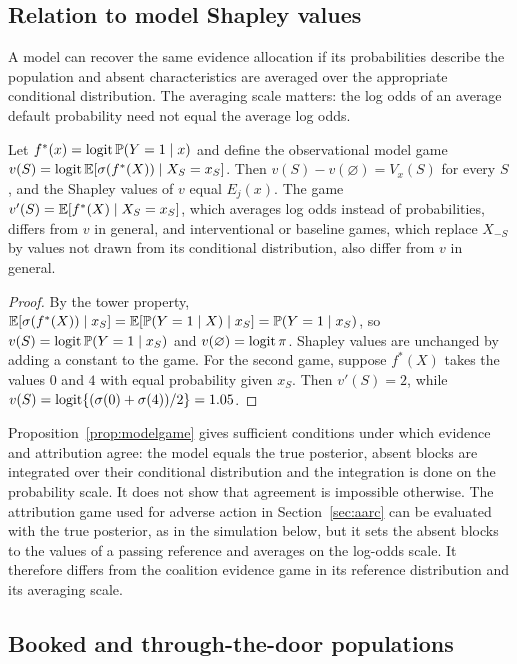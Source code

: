 \subsection{Relation to model Shapley values}

A model can recover the same evidence allocation if its probabilities describe the population and absent characteristics are averaged over the appropriate conditional distribution. The averaging scale matters: the log odds of an average default probability need not equal the average log odds.

\begin{proposition}\label{prop:modelgame}
Let $f^\ast(x)=\operatorname{logit}\mathbb P(Y=1\mid x)$ and define the observational model game $v(S)=\operatorname{logit}\mathbb E[\sigma(f^\ast(X))\mid X_S=x_S]$. Then $v(S)-v(\varnothing)=V_x(S)$ for every $S$, and the Shapley values of $v$ equal $E_j(x)$. The game $v'(S)=\mathbb E[f^\ast(X)\mid X_S=x_S]$, which averages log odds instead of probabilities, differs from $v$ in general, and interventional or baseline games, which replace $X_{-S}$ by values not drawn from its conditional distribution, also differ from $v$ in general.
\end{proposition}
\begin{proof}
By the tower property, $\mathbb E[\sigma(f^\ast(X))\mid x_S]=\mathbb E[\mathbb P(Y=1\mid X)\mid x_S]=\mathbb P(Y=1\mid x_S)$, so $v(S)=\operatorname{logit}\mathbb P(Y=1\mid x_S)$ and $v(\varnothing)=\operatorname{logit}\pi$. Shapley values are unchanged by adding a constant to the game. For the second game, suppose $f^\ast(X)$ takes the values $0$ and $4$ with equal probability given $x_S$. Then $v'(S)=2$, while $v(S)=\operatorname{logit}\{(\sigma(0)+\sigma(4))/2\}=1.05$.
\end{proof}

Proposition~\ref{prop:modelgame} gives sufficient conditions under which evidence and attribution agree: the model equals the true posterior, absent blocks are integrated over their conditional distribution and the integration is done on the probability scale. It does not show that agreement is impossible otherwise. The attribution game used for adverse action in Section~\ref{sec:aarc} can be evaluated with the true posterior, as in the simulation below, but it sets the absent blocks to the values of a passing reference and averages on the log-odds scale. It therefore differs from the coalition evidence game in its reference distribution and its averaging scale.

\subsection{Booked and through-the-door populations}

